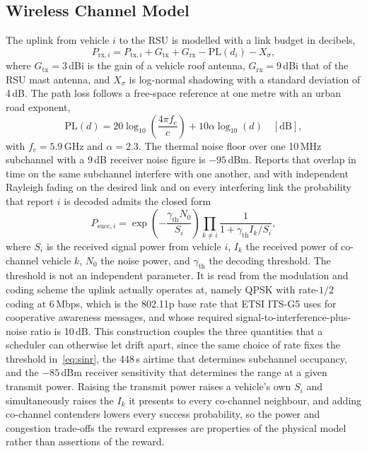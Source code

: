 \documentclass[journal]{IEEEtran}
\begin{document}
\subsection{Wireless Channel Model}
The uplink from vehicle $i$ to the RSU is modelled with a link budget in decibels,
\begin{equation}
    P_{\mathrm{rx},i} = P_{\mathrm{tx},i} + G_{\mathrm{tx}} + G_{\mathrm{rx}} - \mathrm{PL}(d_i) - X_{\sigma},
\end{equation}
where $G_{\mathrm{tx}} = 3$\,dBi is the gain of a vehicle roof antenna, $G_{\mathrm{rx}} = 9$\,dBi that of the RSU mast antenna, and $X_{\sigma}$ is log-normal shadowing with a standard deviation of 4\,dB. The path loss follows a free-space reference at one metre with an urban road exponent,
\begin{equation}
    \mathrm{PL}(d) = 20\log_{10}\!\left(\frac{4\pi f_c}{c}\right) + 10 \alpha \log_{10}(d) \quad [\mathrm{dB}],
\end{equation}
with $f_c = 5.9$\,GHz and $\alpha = 2.3$. The thermal noise floor over one 10\,MHz subchannel with a 9\,dB receiver noise figure is $-95$\,dBm. Reports that overlap in time on the same subchannel interfere with one another, and with independent Rayleigh fading on the desired link and on every interfering link the probability that report $i$ is decoded admits the closed form
\begin{equation}
    P_{\mathrm{succ},i} = \exp\!\left(-\frac{\gamma_{\mathrm{th}} N_0}{S_i}\right) \prod_{k \neq i} \frac{1}{1 + \gamma_{\mathrm{th}} I_k / S_i},
    \label{eq:sinr}
\end{equation}
where $S_i$ is the received signal power from vehicle $i$, $I_k$ the received power of co-channel vehicle $k$, $N_0$ the noise power, and $\gamma_{\mathrm{th}}$ the decoding threshold. The threshold is not an independent parameter. It is read from the modulation and coding scheme the uplink actually operates at, namely QPSK with rate-$1/2$ coding at 6\,Mbps, which is the 802.11p base rate that ETSI ITS-G5 uses for cooperative awareness messages, and whose required signal-to-interference-plus-noise ratio is 10\,dB. This construction couples the three quantities that a scheduler can otherwise let drift apart, since the same choice of rate fixes the threshold in~\eqref{eq:sinr}, the 448\,\textmu s airtime that determines subchannel occupancy, and the $-85$\,dBm receiver sensitivity that determines the range at a given transmit power. Raising the transmit power raises a vehicle's own $S_i$ and simultaneously raises the $I_k$ it presents to every co-channel neighbour, and adding co-channel contenders lowers every success probability, so the power and congestion trade-offs the reward expresses are properties of the physical model rather than assertions of the reward.
\end{document}
